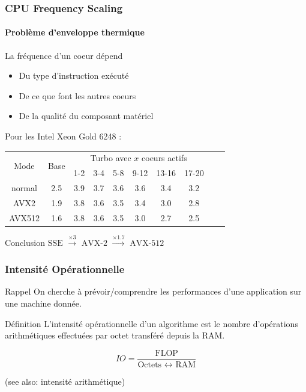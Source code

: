 \documentclass[xcolor={x11names,svgnames}]{beamer}
\begin{document}
\begin{frame}
  \frametitle{CPU Frequency Scaling}
  \framesubtitle{Problème d'enveloppe thermique}
  
  \begin{block}{La fréquence d'un coeur dépend}
  \begin{itemize}
  \item Du type d'instruction exécuté
  \item De ce que font les autres coeurs
  \item De la qualité du composant matériel
  \end{itemize}
\end{block}

\bigskip

Pour les Intel Xeon Gold 6248 :

\medskip

\centering
  \small
\begin{tabular}{|c|c||c|c|c|c|c|c|c|c|}
  \hline
  \multirow{2}{*}{Mode}   & \multirow{2}{*}{Base} & \multicolumn{6}{c|}{Turbo avec $x$ coeurs actifs} \\
  & &             1-2 & 3-4 & 5-8 & 9-12 & 13-16 & 17-20 \\
  \hline\hline
  normal & 2.5	& 3.9 & 3.7 & 3.6 & 3.6 & 3.4 & 3.2 \\
  \hline
  AVX2	 & 1.9	& 3.8 & 3.6 & 3.5 & 3.4 & 3.0 & 2.8 \\
  \hline
  AVX512 & 1.6	& 3.8 & 3.6 & 3.5 & 3.0 & 2.7 & 2.5 \\
  \hline
\end{tabular}

\begin{alertblock}{Conclusion}
  \centering
  $\text{SSE } \xrightarrow{\times 3} \text{ AVX-2 } \xrightarrow{\times 1.7} \text{ AVX-512}$
\end{alertblock}

\end{frame}


\begin{frame}
  \frametitle{Intensité Opérationnelle}

  \begin{block}{Rappel}
    On cherche à prévoir/comprendre les performances d'une application sur une machine donnée.
  \end{block}

  \begin{exampleblock}{Définition}
    L'\alert{intensité opérationnelle} d'un algorithme est le nombre
    d'opérations arithmétiques effectuées par octet transféré depuis la RAM.
  \end{exampleblock}
  
  \[
    IO = \dfrac{\text{FLOP}}{\text{Octets }\leftrightarrow\text{ RAM}}
  \]

  (see also: intensité arithmétique)
\end{frame}
\end{document}
